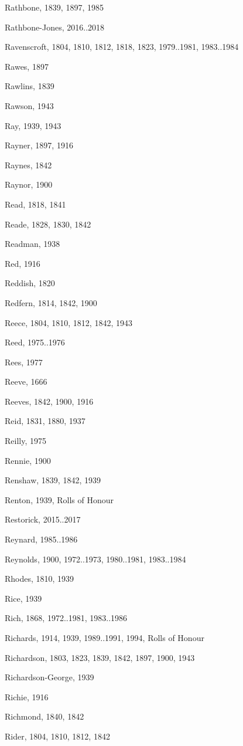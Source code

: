 \begin{theindex}
\item Rathbone, 1839, 1897, 1985
\item Rathbone-Jones, 2016..2018
\item Ravenscroft, 1804, 1810, 1812, 1818, 1823, 1979..1981, 1983..1984
\item Rawes, 1897
\item Rawlins, 1839
\item Rawson, 1943
\item Ray, 1939, 1943
\item Rayner, 1897, 1916
\item Raynes, 1842
\item Raynor, 1900
\item Read, 1818, 1841
\item Reade, 1828, 1830, 1842
\item Readman, 1938
\item Red, 1916
\item Reddish, 1820
\item Redfern, 1814, 1842, 1900
\item Reece, 1804, 1810, 1812, 1842, 1943
\item Reed, 1975..1976
\item Rees, 1977
\item Reeve, 1666
\item Reeves, 1842, 1900, 1916
\item Reid, 1831, 1880, 1937
\item Reilly, 1975
\item Rennie, 1900
\item Renshaw, 1839, 1842, 1939
\item Renton, 1939, Rolls of Honour
\item Restorick, 2015..2017
\item Reynard, 1985..1986
\item Reynolds, 1900, 1972..1973, 1980..1981, 1983..1984
\item Rhodes, 1810, 1939
\item Rice, 1939
\item Rich, 1868, 1972..1981, 1983..1986
\item Richards, 1914, 1939, 1989..1991, 1994, Rolls of Honour
\item Richardson, 1803, 1823, 1839, 1842, 1897, 1900, 1943
\item Richardson-George, 1939
\item Richie, 1916
\item Richmond, 1840, 1842
\item Rider, 1804, 1810, 1812, 1842

\end{theindex}
